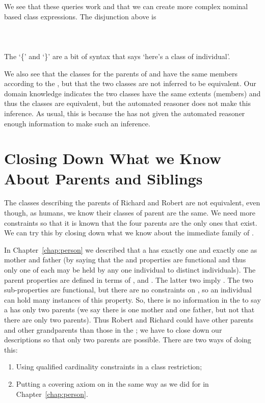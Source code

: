 We see that these queries work and that we can create more complex nominal based class expressions. The disjunction above is
\\\\
\\\\
The `\{' and `\}' are a bit of syntax that says `here's a class of individual'.

We also see that the classes for the parents of \rds and \rjs have the same members according to the \fhkb, but that the two classes are not inferred to be equivalent. Our domain knowledge indicates the two classes have the same extents (members) and thus the classes are equivalent, but the automated reasoner does not make this inference. As usual, this is because the \fhkb has not given the automated reasoner enough information to make such an inference.

\section{Closing Down What we Know About Parents and Siblings}
\label{sec:nom_owa}

The classes describing the parents of Richard and Robert are not equivalent, even though, as humans, we know their classes of parent are the same. We need more constraints so that it is known that the four parents are the only ones that exist. We can try this by closing down what we know about the immediate family of \rds.

In Chapter~\ref{chap:person} we described that a \person has exactly one \woman and exactly one \man as mother and father (by saying that the  and  properties are functional and thus only one of each may be held by any one individual to distinct individuals). The parent properties are defined in terms of ,  and . The latter two imply . The two sub-properties are functional, but there are no constraints on , so an individual can hold many instances of this property. So, there is no information in the \fhkb to say a \person has only two parents (we say there is one mother and one father, but not that there are only two parents). Thus Robert and Richard could have other parents and other grandparents than those in the \fhkb; we have to close down our descriptions so that only two parents are possible. There are two ways of doing this:
\begin{enumerate}
\item Using qualified cardinality constraints in a class restriction;
\item Putting a covering axiom on  in the same way as we did for  in Chapter~\ref{chap:person}.
\end{enumerate}

